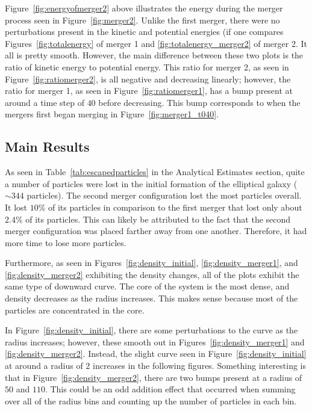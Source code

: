\documentclass[12pt]{report}
\begin{document}
Figure~\ref{fig:energyofmerger2} above illustrates the energy during the merger process seen in Figure~\ref{fig:merger2}. Unlike the first merger, there were no perturbations present in the kinetic and potential energies (if one compares Figures~\ref{fig:totalenergy} of merger 1 and \ref{fig:totalenergy_merger2} of merger 2. It all is pretty smooth. However, the main difference between these two plots is the ratio of kinetic energy to potential energy. This ratio for merger 2, as seen in Figure~\ref{fig:ratiomerger2}, is all negative and decreasing linearly; however, the ratio for merger 1, as seen in Figure~\ref{fig:ratiomerger1},  has a bump present at around a time step of $40$ before decreasing. This bump corresponds to when the mergers first began merging in Figure~\ref{fig:merger1_t040}.


\subsection*{Main Results}

As seen in Table~\ref{tab:escapedparticles} in the Analytical Estimates section, quite a number of particles were lost in the initial formation of the elliptical galaxy ($\sim 344$ particles). The second merger configuration lost the most particles overall. It lost 
$10\%$ of its particles in comparison to the first merger that lost only about $2.4\%$ of its particles. This can likely be attributed to the fact that the second merger configuration was placed farther away from one another. Therefore, it had more time to lose more particles.

Furthermore, as seen in Figures~\ref{fig:density_initial}, \ref{fig:density_merger1}, and \ref{fig:density_merger2} exhibiting the density changes, all of the plots exhibit the same type of downward curve. The core of the system is the most dense, and density decreases as the radius increases. This makes sense because most of the particles are concentrated in the core.

In Figure~\ref{fig:density_initial}, there are some perturbations to the curve as the radius increases; however, these smooth out in Figures~\ref{fig:density_merger1} and \ref{fig:density_merger2}. Instead, the slight curve seen in Figure~\ref{fig:density_initial} at around a radius of $2$ increases in the following figures. Something interesting is that in Figure~\ref{fig:density_merger2}, there are two bumps present at a radius of $50$ and $110$. This could be an odd addition effect that occurred when summing over all of the radius bins and counting up the number of particles in each bin. 
\end{document}

